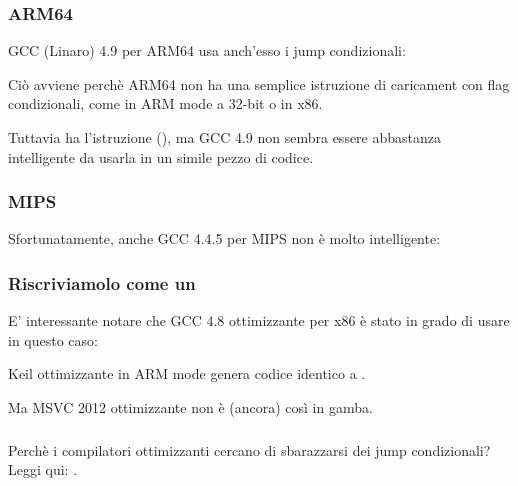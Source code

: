 

\subsubsection{ARM64}

\Optimizing GCC (Linaro) 4.9 per ARM64 usa anch'esso i jump condizionali:



Ciò avviene perchè ARM64 non ha una semplice istruzione di caricament con flag condizionali, come  in ARM mode a 32-bit o  in x86.

Tuttavia ha l'istruzione  (),
ma GCC 4.9 non sembra essere abbastanza intelligente da usarla in un simile pezzo di codice.

\subsubsection{MIPS}

Sfortunatamente, anche GCC 4.4.5 per MIPS non è molto intelligente:



\subsubsection{Riscriviamolo come un }




E' interessante notare che GCC 4.8 ottimizzante per x86 è stato in grado di usare  in questo caso:



Keil ottimizzante in ARM mode genera codice identico a .

Ma MSVC 2012 ottimizzante non è (ancora) così in gamba.

\subsubsection{\Conclusion{}}

Perchè i compilatori ottimizzanti cercano di sbarazzarsi dei jump condizionali? Leggi qui: .
